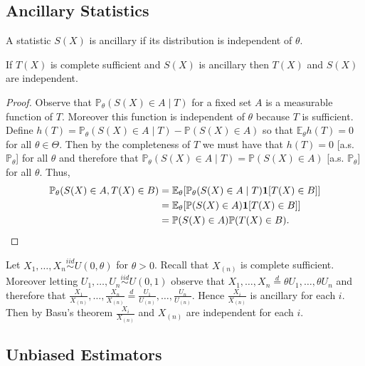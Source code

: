 \subsection{Ancillary Statistics}

\begin{definition}
	A statistic $S(X)$ is ancillary if its distribution is independent of $\theta$. 
\end{definition}

\begin{theorem}[Basu]
	If $T(X)$ is complete sufficient and $S(X)$ is ancillary then $T(X)$ and $S(X)$ are independent.
\end{theorem}

\begin{proof}
	Observe that $\mathbb P_\theta(S(X) \in A \mid T)$ for a fixed set $A$ is a measurable function of $T$. Moreover this function is independent of $\theta$ because $T$ is sufficient. Define $h(T) = \mathbb P_\theta(S(X) \in A \mid T) - \mathbb P(S(X) \in A)$ so that $\mathbb E_\theta h(T) = 0$ for all $\theta \in \Theta$.  Then by the completeness of $T$ we must have that $h(T) = 0$ [a.s. $\mathbb P_\theta$] for all $\theta$ and therefore that $\mathbb P_\theta(S(X) \in A \mid T) =  \mathbb P(S(X) \in A)$ [a.s. $\mathbb P_\theta$] for all $\theta$. Thus, 
	\begin{align*}
	\mathbb{P}_\theta(S(X)\in A,T(X)\in B)
	&= \mathbb{E}_\theta\!\left[
	   \mathbb{P}_\theta(S(X)\in A\mid T)\mathbf 1[T(X)\in B]
	   \right] \\
	&= \mathbb{E}_\theta\!\left[
	   \mathbb{P}(S(X)\in A)\mathbf 1[T(X)\in B]
	   \right] \\
	&= \mathbb{P}(S(X)\in A)\mathbb{P}(T(X)\in B).
	\end{align*}
\end{proof}

\begin{example}
Let $X_1, \dots, X_n \overset{iid}{\sim} U(0, \theta)$ for $\theta > 0$. Recall that $X_{(n)}$ is complete sufficient. Moreover letting $U_1, \dots, U_n \overset{iid}{\sim} U(0, 1)$ observe that $X_1, \dots, X_n \overset{d}{=} \theta U_1, \dots, \theta U_n$ and therefore that $\frac{X_1}{X_{(n)}}, \dots, \frac{X_{n}}{X_{(n)}} \overset{d}{=} \frac{U_1}{U_{(n)}}, \dots, \frac{U_{n}}{U_{(n)}}$. Hence $\frac{X_i}{X_{(n)}}$ is ancillary for each $i$. Then by Basu's theorem $\frac{X_i}{X_{(n)}}$ and $X_{(n)}$ are independent for each $i$.
\end{example}


\subsection{Unbiased Estimators}

